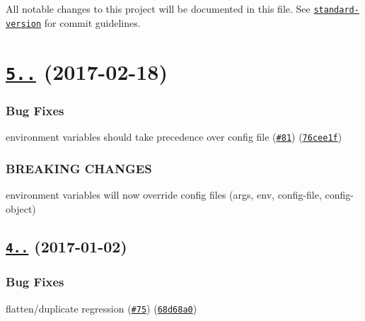 All notable changes to this project will be documented in this file. See \href{https://github.com/conventional-changelog/standard-version}{\tt standard-\/version} for commit guidelines.

\label{_5.0.0}%
 \section*{\href{https://github.com/yargs/yargs-parser/compare/v4.2.1...v5.0.0}{\tt 5..} (2017-\/02-\/18)}

\subsubsection*{Bug Fixes}


\begin{DoxyItemize}
\item environment variables should take precedence over config file (\href{https://github.com/yargs/yargs-parser/issues/81}{\tt \#81}) (\href{https://github.com/yargs/yargs-parser/commit/76cee1f}{\tt 76cee1f})
\end{DoxyItemize}

\subsubsection*{B\+R\+E\+A\+K\+I\+NG C\+H\+A\+N\+G\+ES}


\begin{DoxyItemize}
\item environment variables will now override config files (args, env, config-\/file, config-\/object)
\end{DoxyItemize}

\label{_4.2.1}%
 \subsection*{\href{https://github.com/yargs/yargs-parser/compare/v4.2.0...v4.2.1}{\tt 4..} (2017-\/01-\/02)}

\subsubsection*{Bug Fixes}


\begin{DoxyItemize}
\item flatten/duplicate regression (\href{https://github.com/yargs/yargs-parser/issues/75}{\tt \#75}) (\href{https://github.com/yargs/yargs-parser/commit/68d68a0}{\tt 68d68a0})
\end{DoxyItemize}

